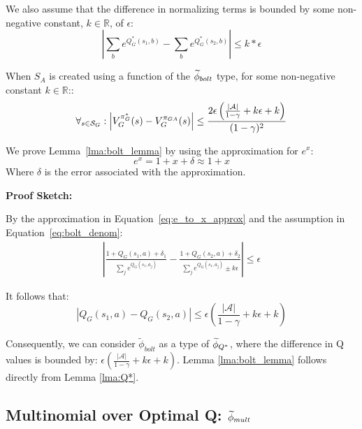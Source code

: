 We also assume that the difference in normalizing terms is bounded by some non-negative constant, $k\in \mathbb{R}$, of $\epsilon$:
\begin{equation}
\left| \sum_b e^{Q_G^*(s_1,b)} - \sum_b e^{Q_G^*(s_2,b)} \right| \leq k*\epsilon
\label{eq:bolt_denom}
\end{equation}
\begin{lma} When $S_A$ is created using a function of the $\widetilde \phi_{bolt}$ type, for some non-negative constant $k \in \mathbb{R}$::
\begin{equation}
\forall_{s \in \mathcal{S}_G} : \left| V_G^{\pi^*_G}(s) - V_G^{\pi_{GA}}(s) \right| \leq \frac{2\epsilon\left(\frac{|\mathcal{A}|}{1-\gamma} + k\epsilon + k\right)}{(1-\gamma)^2}
\end{equation}
\label{lma:bolt_lemma}
\end{lma}
We prove Lemma~\ref{lma:bolt_lemma} by using the approximation for $e^x$:
\begin{equation}
 e^x = 1 + x + \delta  \approx 1 + x
\label{eq:e_to_x_approx}
\end{equation}
Where $\delta$ is the error associated with the approximation.

{\bf Proof Sketch:}

By the approximation in Equation~\ref{eq:e_to_x_approx} and the assumption in Equation~\ref{eq:bolt_denom}:
\begin{align*}
\left|\frac{1 + Q_G(s_1,a) + \delta_1}{\sum_j e^{Q_G(s_1,a_j)}} - \frac{1 + Q_G(s_2,a) + \delta_2}{\sum_j e^{Q_G(s_1,a_j)} \pm k\epsilon}\right| \leq \epsilon
\end{align*}

It follows that:
\begin{equation}
\left|Q_G(s_1,a) - Q_G(s_2,a)\right| \leq \epsilon \left(\frac{|\mathcal{A}|}{1-\gamma} + k\epsilon + k \right)
\label{eq:bolt_qs}
\end{equation}

Consequently, we can consider $\widetilde{\phi}_{bolt}$ as a type of $\widetilde \phi_{Q^*}$, where the difference in Q values is bounded by: $\epsilon \left(\frac{|\mathcal{A}|}{1-\gamma} + k\epsilon + k \right)$. Lemma \ref{lma:bolt_lemma} follows directly from Lemma \ref{lma:Q*}.

\subsection{Multinomial over Optimal Q: $\widetilde \phi_{mult}$}
\label{sec:mult}

